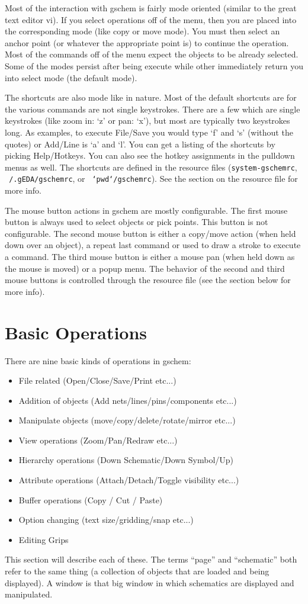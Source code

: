 \documentclass{article}
\begin{document}
Most of the interaction with gschem is fairly mode oriented
(similar to the great text editor vi).  If you select operations off of
the menu, then you are placed into the corresponding mode (like copy
or move mode).  You must then select an anchor point (or whatever the
appropriate point is) to continue the operation.  Most of the commands
off of the menu expect the objects to be already selected.  Some of the
modes persist after being execute while other immediately return you
into select mode (the default mode).

The shortcuts are also mode like in nature.  Most of the default
shortcuts are for the various commands are not single keystrokes.
There are a few which are single keystrokes (like zoom in: `z' or
pan: `x'), but most are typically two keystrokes long.  As examples,
to execute File/Save you would type `f' and `s' (without the quotes)
or Add/Line is `a' and `l'.  You can get a listing of the shortcuts by
picking Help/Hotkeys.  You can also see the hotkey assignments in the
pulldown menus as well.  The shortcuts are defined in the resource files
({\tt system-gschemrc}, {\tt ~/.gEDA/gschemrc}, or {\tt
  `pwd`/gschemrc}).  See the section 
on the resource file for more info.

The mouse button actions in gschem are mostly configurable.
The first mouse button is always used to select objects or pick points.
This button is not configurable.  The second mouse button is either a
copy/move action (when held down over an object), a repeat last command
or used to draw a stroke to execute a command.  The third mouse button is
either a mouse pan (when held down as the mouse is moved) or a popup menu.
The behavior of the second and third mouse buttons is controlled through
the resource file (see the section below for more info).

\section{Basic Operations}
There are nine basic kinds of operations in gschem:
\begin{itemize}
\item File related (Open/Close/Save/Print etc...)
\item Addition of objects (Add nets/lines/pins/components etc...)
\item Manipulate objects (move/copy/delete/rotate/mirror etc...)
\item View operations (Zoom/Pan/Redraw etc...)
\item Hierarchy operations (Down Schematic/Down Symbol/Up)
\item Attribute operations (Attach/Detach/Toggle visibility etc...)
\item Buffer operations (Copy / Cut / Paste)
\item Option changing (text size/gridding/snap etc...)
\item Editing Grips
\end{itemize}
This section will describe each of these.
The terms ``page'' and ``schematic'' both refer to the same thing (a
collection of objects that are loaded and being displayed).
A window is that big window in which schematics are displayed
and manipulated.
\end{document}
